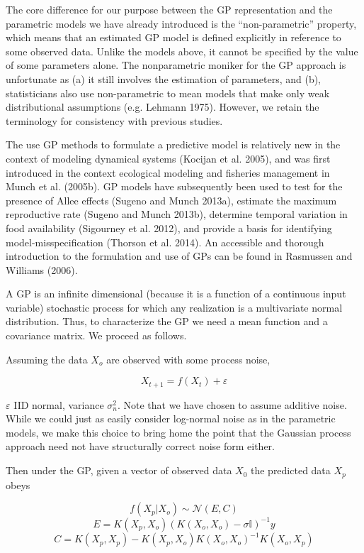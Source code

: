 \documentclass[]{components/elsarticle}
\begin{document}
The core difference for our purpose between the GP representation and
the parametric models we have already introduced is the
``non-parametric'' property, which means that an estimated GP model is
defined explicitly in reference to some observed data. Unlike the models
above, it cannot be specified by the value of some parameters alone. The
nonparametric moniker for the GP approach is unfortunate as (a) it still
involves the estimation of parameters, and (b), statisticians also use
non-parametric to mean models that make only weak distributional
assumptions (e.g. Lehmann 1975). However, we retain the terminology for
consistency with previous studies.

The use GP methods to formulate a predictive model is relatively new in
the context of modeling dynamical systems (Kocijan et al. 2005), and was
first introduced in the context ecological modeling and fisheries
management in Munch et al. (2005b). GP models have subsequently been
used to test for the presence of Allee effects (Sugeno and Munch 2013a),
estimate the maximum reproductive rate (Sugeno and Munch 2013b),
determine temporal variation in food availability (Sigourney et al.
2012), and provide a basis for identifying model-misspecification
(Thorson et al. 2014). An accessible and thorough introduction to the
formulation and use of GPs can be found in Rasmussen and Williams
(2006).

A GP is an infinite dimensional (because it is a function of a
continuous input variable) stochastic process for which any realization
is a multivariate normal distribution. Thus, to characterize the GP we
need a mean function and a covariance matrix. We proceed as follows.

Assuming the data $X_o$ are observed with some process noise,

\[X_{t+1} = f(X_t) + \varepsilon\]

$\varepsilon$ IID normal, variance $\sigma_n^2$. Note that we have
chosen to assume additive noise. While we could just as easily consider
log-normal noise as in the parametric models, we make this choice to
bring home the point that the Gaussian process approach need not have
structurally correct noise form either.

Then under the GP, given a vector of observed data $X_0$ the predicted
data $X_p$ obeys

\[f(X_p|X_o) \sim \mathcal{N}(E,C)\]
\[E = K(X_p, X_o) \left(K(X_o,X_o) - \sigma \mathbb{I} \right)  ^{-1} y\]
\[C = K(X_p, X_p) - K(X_p, X_o) K(X_o,X_o)^{-1} K(X_o, X_p)\]
\end{document}
